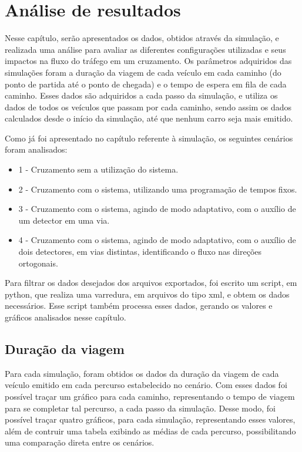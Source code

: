 \chapter{Análise de resultados}

Nesse capítulo, serão apresentados os dados, obtidos através da simulação, e realizada uma análise para avaliar as diferentes configurações utilizadas e seus impactos na fluxo do tráfego em um cruzamento. Os parâmetros adquiridos das simulações foram a duração da viagem de cada veículo em cada caminho (do ponto de partida até o ponto de chegada) e o tempo de espera em fila de cada caminho. Esses dados são adquiridos a cada passo da simulação, e utiliza os dados de todos os veículos que passam por cada caminho, sendo assim os dados calculados desde o início da simulação, até que nenhum carro seja mais emitido.

Como já foi apresentado no capítulo referente à simulação, os seguintes cenários foram analisados:

\begin{itemize}
\item 1 - Cruzamento sem a utilização do sistema.
\item 2 - Cruzamento com o sistema, utilizando uma programação de tempos fixos.
\item 3 - Cruzamento com o sistema, agindo de modo adaptativo, com o auxílio de um detector em uma via.
\item 4 - Cruzamento com o sistema, agindo de modo adaptativo, com o auxílio de dois detectores, em vias distintas, identificando o fluxo nas direções ortogonais. %
\end{itemize}

Para filtrar os dados desejados dos arquivos exportados, foi escrito um script, em python, que realiza uma varredura, em arquivos do tipo xml, e obtem os dados necessários. Esse script também processa esses dados, gerando os valores e gráficos analisados nesse capítulo.

\section{Duração da viagem}

Para cada simulação, foram obtidos os dados da duração da viagem de cada veículo emitido em cada percurso estabelecido no cenário. Com esses dados foi possível traçar um gráfico para cada caminho, representando o tempo de viagem para se completar tal percurso, a cada passo da simulação. Desse modo, foi possível traçar quatro gráficos, para cada simulação, representando esses valores, além de contruir uma tabela exibindo as médias de cada percurso, possibilitando uma comparação direta entre os cenários.

